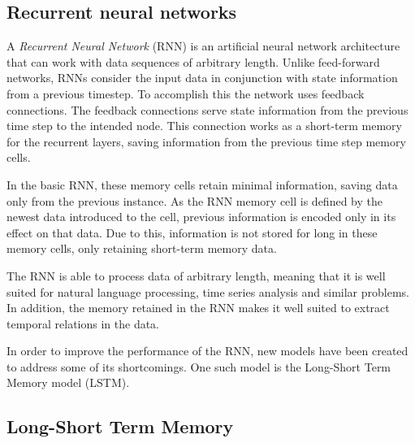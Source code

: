 \subsection{Recurrent neural networks}

A \textit{Recurrent Neural Network} (RNN) is an artificial neural network architecture that can work with data sequences of arbitrary length.
Unlike feed-forward networks, RNNs consider the input data in conjunction with state information from a previous timestep.
To accomplish this the network uses feedback connections.
The feedback connections serve state information from the previous time step to the intended node.
This connection works as a short-term memory for the recurrent layers, saving information from the previous time step memory cells.

In the basic RNN, these memory cells retain minimal information, saving data only from the previous instance.
As the RNN memory cell is defined by the newest data introduced to the cell, previous information is encoded only in its effect on that data.
Due to this, information is not stored for long in these memory cells, only retaining short-term memory data.



The RNN is able to process data of arbitrary length, meaning that it is well suited for natural language processing, time series analysis and similar problems.
In addition, the memory retained in the RNN makes it well suited to extract temporal relations in the data.


In order to improve the performance of the RNN, new models have been created to address some of its shortcomings.
One such model is the Long-Short Term Memory model (LSTM).


\cite[p.~469-472]{Geron2017}

\subsection{Long-Short Term Memory}

